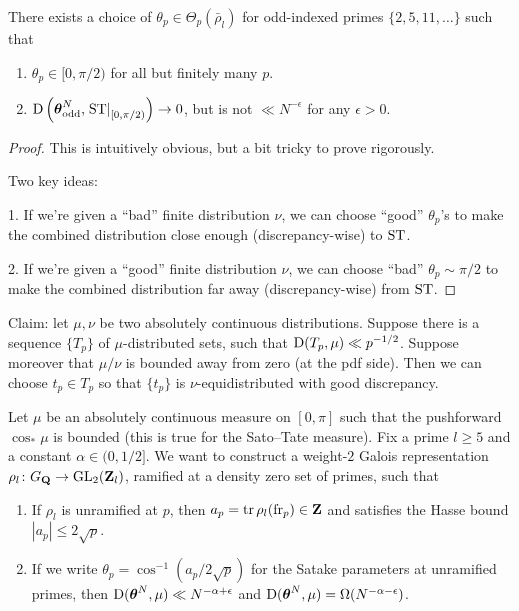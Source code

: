 \begin{theorem}
There exists a choice of $\theta_p\in \Theta_p(\bar\rho_l)$ for odd-indexed 
primes $\{2,5,11,\dots\}$ such that 
\begin{enumerate}
\item
$\theta_p\in [0,\pi/2)$ for all but finitely many $p$. 

\item
$\operatorname{D}\left({\boldsymbol\theta}_{\mathrm{odd}}^N, \left.\mathrm{ST}\right|_{[0,\pi/2)}\right) \to 0$, 
but is not $\ll N^{-\epsilon}$ for any $\epsilon>0$. 
\end{enumerate}
\end{theorem}
\begin{proof}
This is intuitively obvious, but a bit tricky to prove rigorously. 

Two key ideas: 

1. If we're given a ``bad'' finite distribution $\nu$, we can choose ``good'' 
$\theta_p$'s to make the combined distribution close enough (discrepancy-wise) 
to $\mathrm{ST}$. 

2. If we're given a ``good'' finite distribution $\nu$, we can choose ``bad'' 
$\theta_p\sim \pi/2$ to make the combined distribution far away 
(discrepancy-wise) from $\mathrm{ST}$. 
\end{proof}

Claim: let $\mu,\nu$ be two absolutely continuous distributions. Suppose there 
is a sequence $\{T_p\}$ of $\mu$-distributed sets, such that 
$\operatorname{D}(T_p,\mu) \ll p^{-1/2}$. Suppose moreover that $\mu/\nu$ is bounded away 
from zero (at the pdf side). Then we can choose $t_p\in T_p$ so that 
$\{t_p\}$ is $\nu$-equidistributed with good discrepancy. 

Let $\mu$ be an absolutely continuous measure on $[0,\pi]$ such that the 
pushforward $\cos_\ast \mu$ is bounded (this is true for the Sato--Tate 
measure). Fix a prime $l\geqslant 5$ and a constant $\alpha\in (0,1/2]$. We 
want to construct a weight-$2$ Galois representation 
$\rho_l\colon G_{\mathbf{Q}} \to \operatorname{GL}_2(\mathbf{Z}_l)$, ramified at a density zero set of 
primes, such that 
\begin{enumerate}
\item
If $\rho_l$ is unramified at $p$, then $a_p = \operatorname{tr} \rho_l(\mathrm{fr}_p)\in \mathbf{Z}$ and 
satisfies the Hasse bound $|a_p| \leqslant 2\sqrt p$. 

\item
If we write $\theta_p = \cos^{-1}(a_p / 2\sqrt p)$ for the Satake parameters at 
unramified primes, then $\operatorname{D}({\boldsymbol\theta}^N, \mu) \ll N^{-\alpha+\epsilon}$ and 
$\operatorname{D}({\boldsymbol\theta}^N,\mu) = \Omega(N^{-\alpha-\epsilon})$. 
\end{enumerate}

